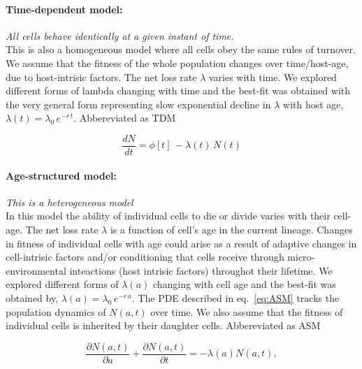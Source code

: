 \documentclass[11.5pt]{article}
\newcommand{\be}{\begin{equation}}
\newcommand{\ee}{\end{equation}}
\begin{document}
\paragraph*{Time-dependent model:} 
\textit{All cells behave identically at a given instant of time.} \\
This is also a homogeneous model where all cells obey the same rules of turnover. We assume that the fitness of the whole population changes over time/host-age, due to host-intrisic factors. 
The net loss rate $\lambda$ varies with time. We explored different forms of lambda changing with time and the best-fit was obtained with the very general form representing slow exponential decline in $\lambda$ with host age, $\lambda(t) = \lambda_0 \, e^{-r\,t}$.
Abbereviated as TDM

\be
\frac{dN}{dt} = \phi[t] \, - \lambda(t) \, N(t)
\label{eq:TDM}
\ee


\paragraph*{Age-structured model:} 
\textit{This is a heterogeneous model} \\
In this model the ability of individual cells to die or divide varies with their cell-age. 
The net loss rate $\lambda$ is a function of cell's age in the current lineage. 
Changes in fitness of individual cells with age could arise as a result of adaptive changes in cell-intrisic factors and/or conditioning that cells receive through micro-environmental inteactions (host intrisic factors) throughot their lifetime.
We explored different forms of $\lambda(a)$ changing with cell age and the best-fit was obtained by, $\lambda(a) = \lambda_0 \, e^{-r \,a} $.
The PDE described in eq.~\ref{eq:ASM} tracks the population dynamics of $N(a,t)$ over time.
We also assume that the fitness of individual cells is inherited by their daughter cells.
Abbereviated as ASM

\be
\frac{\partial{N(a,t)}}{\partial{a}} + \frac{\partial{N(a,t)}}{\partial{t}} = - \lambda(a) N(a,t),
\label{eq:ASM}
\ee
\end{document}
